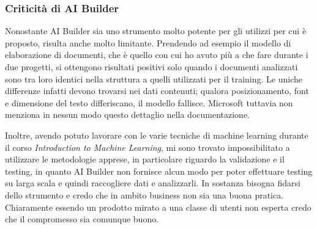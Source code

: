 \subsubsection{Criticità di AI Builder}
Nonostante AI Builder sia uno strumento molto potente per gli utilizzi per cui è proposto, risulta anche molto limitante. Prendendo ad esempio il modello di elaborazione di documenti, che è quello con cui ho avuto più a che fare durante i due progetti, si ottengono risultati positivi solo quando i documenti analizzati sono tra loro identici nella struttura a quelli utilizzati per il training. Le uniche differenze infatti devono trovarsi nei dati contenuti; qualora posizionamento, font e dimensione del testo differiscano, il modello fallisce. Microsoft tuttavia non menziona in nessun modo questo dettaglio nella documentazione.

Inoltre, avendo potuto lavorare con le varie tecniche di machine learning durante il corso \textit{Introduction to Machine Learning}, mi sono trovato impossibilitato a utilizzare le metodologie apprese, in particolare riguardo la validazione e il testing, in quanto AI Builder non fornisce alcun modo per poter effettuare testing su larga scala e quindi raccogliere dati e analizzarli. In sostanza bisogna fidarsi dello strumento e credo che in ambito business non sia una buona pratica. Chiaramente essendo un prodotto mirato a una classe di utenti non esperta credo che il compromesso sia comunque buono.

